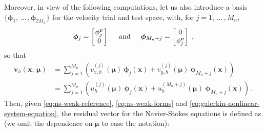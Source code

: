 \documentclass[12pt, a4paper, twoside, openright]{report}
\numberwithin{equation}{chapter}
\theoremstyle{theorem}
\theoremstyle{definition}
\theoremstyle{remark}
\theoremstyle{proposition}
\numberwithin{figure}{chapter}
\newcommand{\bg}[1]{\boldsymbol{#1}}
\begin{document}
		Moreover, in view of the following computations, let us also introduce a basis $\big\lbrace \bg{\phi}_1, \, \ldots \, , \bg{\phi}_{2 M_n} \big\rbrace$ for the velocity trial and test space, with, for $j = 1, \, \ldots \, , M_n$,
		\begin{equation*}
			\bg{\phi}_j = 
			\begin{bmatrix}
			\hspace*{-0.15cm}
			\begin{array}{c} 
				\phi_j^{\bg{v}} \\
				0 
			\end{array} 
			\hspace*{-0.15cm}
			\end{bmatrix} 
			\hspace*{0.5cm} \text{and} \hspace*{0.5cm} \bg{\phi}_{M_n + j} = 
			\begin{bmatrix}
			\hspace*{-0.15cm}
			\begin{array}{c} 
				0 \\
				\phi_j^{\bg{v}}  
			\end{array} 
			\hspace*{-0.15cm}
			\end{bmatrix} \, ,
		\end{equation*}
		so that
		\begin{equation*}
			\begin{aligned}
			\bg{v}_h(\bg{x}; \, \bg{\mu}) & = \sum_{j = 1}^{M_n} \left( v_{x,h}^{(j)}(\bg{\mu}) ~ \bg{\phi}_{j}(\bg{x}) + v_{y,h}^{(j)}(\bg{\mu}) ~ \bg{\phi}_{M_n + j}(\bg{x}) \right) \\
			& = \sum_{j = 1}^{M_n} \left( u_h^{(j)}(\bg{\mu}) ~ \bg{\phi}_{j}(\bg{x}) + u_h^{(M_n + j)}(\bg{\mu}) ~ \bg{\phi}_{M_n + j}(\bg{x}) \right) \, .
			\end{aligned}
		\end{equation*}
		Then, given \eqref{eq:ns-weak-reference}, \eqref{eq:ns-weak-forms} and \eqref{eq:galerkin-nonlinear-system-equation}, the residual vector for the Navier-Stokes equations is defined as (we omit the dependence on $\bg{\mu}$ to ease the notation): 
\end{document}
